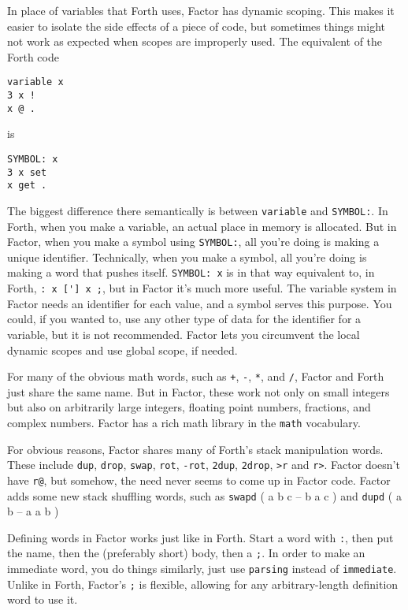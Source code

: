 \documentclass{article}
\begin{document}
In place of variables that Forth uses, Factor has dynamic scoping. This makes it easier to isolate the side effects of a piece of code, but sometimes things might not work as expected when scopes are improperly used. The equivalent of the Forth code
\begin{verbatim}
variable x
3 x !
x @ .
\end{verbatim}
is
\begin{verbatim}
SYMBOL: x
3 x set
x get .
\end{verbatim}
The biggest difference there semantically is between \texttt{variable} and \texttt{SYMBOL:}. In Forth, when you make a variable, an actual place in memory is allocated. But in Factor, when you make a symbol using \texttt{SYMBOL:}, all you're doing is making a unique identifier. Technically, when you make a symbol, all you're doing is making a word that pushes itself. \verb|SYMBOL: x| is in that way equivalent to, in Forth, \verb|: x ['] x ;|, but in Factor it's much more useful. The variable system in Factor needs an identifier for each value, and a symbol serves this purpose. You could, if you wanted to, use any other type of data for the identifier for a variable, but it is not recommended. Factor lets you circumvent the local dynamic scopes and use global scope, if needed.

For many of the obvious math words, such as \texttt{+}, \texttt{-}, \texttt{*}, and \texttt{/}, Factor and Forth just share the same name. But in Factor, these work not only on small integers but also on arbitrarily large integers, floating point numbers, fractions, and complex numbers. Factor has a rich math library in the \verb|math| vocabulary.

For obvious reasons, Factor shares many of Forth's stack manipulation words. These include \texttt{dup}, \texttt{drop}, \texttt{swap}, \texttt{rot}, \texttt{-rot}, \texttt{2dup}, \texttt{2drop}, \texttt{>r} and \texttt{r>}. Factor doesn't have \texttt{r@}, but somehow, the need never seems to come up in Factor code. Factor adds some new stack shuffling words, such as \texttt{swapd} ( a b c -- b a c ) and \texttt{dupd} ( a b -- a a b )

Defining words in Factor works just like in Forth. Start a word with \texttt{:}, then put the name, then the (preferably short) body, then a \texttt{;}. In order to make an immediate word, you do things similarly, just use \texttt{parsing} instead of \texttt{immediate}. Unlike in Forth, Factor's \texttt{;} is flexible, allowing for any arbitrary-length definition word to use it.
\end{document}
